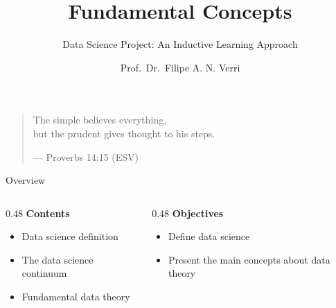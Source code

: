 


\title{Fundamental Concepts}
\subtitle{Data Science Project: An Inductive Learning Approach}
\author{Prof.~Dr.~Filipe A. N. Verri}
\date{}



\maketitle
\bookframe


\begin{frame}{}
  \vfill
  \begin{quote}
    The simple believes everything,\\
    but the prudent gives thought to his steps.
    \begin{flushright}
      --- Proverbs 14:15 (ESV)
    \end{flushright}
  \end{quote}
  \vfill
\end{frame}


\begin{frame}{Overview}
  \begin{columns}[T]
    \begin{column}{0.48\textwidth}
      \textbf{Contents}
      \begin{itemize}
        \item Data science definition
        \item The data science continuum
        \item Fundamental data theory
      \end{itemize}
    \end{column}
    \begin{column}{0.48\textwidth}
      \textbf{Objectives}
      \begin{itemize}
        \item Define data science
        \item Present the main concepts about data theory
      \end{itemize}
    \end{column}
  \end{columns}
\end{frame}

